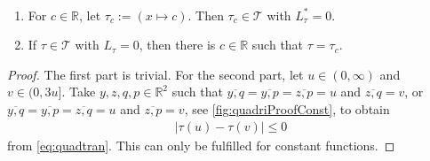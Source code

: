 \documentclass{article}
\newcommand{\abs}[1]{\left| #1 \right|} %
\newcommand*{\mc}[1]{\mathcal{#1}}
\newcommand{\R}{\mathbb{R}}
\newcommand{\Rpp}{(0, \infty)} %
\newcommand{\ol}[2]{\overline{#1,#2}}
\newcommand{\tran}{\tau}
\newcommand{\Tran}{\mc{T}}
\newcommand{\ctransymbol}{L}
\newcommand{\ctrano}[1]{\ctransymbol_{#1}}
\newcommand{\ctranobest}[1]{\ctransymbol_{#1}^{*}}
\newcommand{\ctranbest}{\ctranobest{\tran}}
\newcommand{\ctran}{\ctrano{\tran}}
\begin{document}
%
%
\begin{lemma}\label{lmm:quadconst}\mbox{ }
	\begin{enumerate}[label=(\roman*)]
		\item\label{lmm:quadconst:constisquad} For $c\in\R$, let $\tran_c := (x\mapsto c)$. Then $\tran_c\in\Tran$ with $\ctranbest = 0$.
		\item\label{lmm:quadconst:quadzeroisconst} If $\tran\in\Tran$ with $\ctran = 0$, then there is $c\in\R$ such that $\tran = \tran_c$.
	\end{enumerate}
\end{lemma}
%
\begin{proof}
	The first part is trivial. For the second part, let $u\in\Rpp$ and $v\in(0,3u]$. Take $y,z,q,p\in\R^2$ such that $\ol yq = \ol yp = \ol zp = u$ and  $\ol zq = v$, or $\ol yq = \ol yp = \ol zq = u$ and $\ol zp = v$, see \cref{fig:quadriProofConst}, to obtain
	\begin{align}
		\abs{\tran(u) - \tran(v)} \leq 0
	\end{align}
	from \eqref{eq:quadtran}. This can only be fulfilled for constant functions.
\end{proof}
%
%
\end{document}
